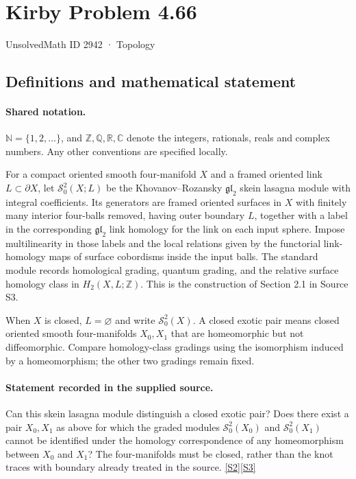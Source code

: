 \documentclass[11pt]{article}
\newcommand{\sref}[2]{\hyperlink{source:#1:#2}{[S#2]}}
\begin{document}
\setcounter{section}{2941}
\section{Kirby Problem 4.66}\label{2942}
{\small\sffamily UnsolvedMath ID 2942 · Topology}
\subsection{Definitions and mathematical statement}

\paragraph{Shared notation.}$\mathbb N=\{1,2,\ldots\}$, and $\mathbb Z,\mathbb Q,\mathbb R,\mathbb C$ denote the integers, rationals, reals and complex numbers. Any other conventions are specified locally.


For a compact oriented smooth four-manifold $X$ and a framed oriented link $L\subset\partial X$, let $\mathcal S_0^2(X;L)$ be the Khovanov--Rozansky $\mathfrak{gl}_2$ skein lasagna module with integral coefficients. Its generators are framed oriented surfaces in $X$ with finitely many interior four-balls removed, having outer boundary $L$, together with a label in the corresponding $\mathfrak{gl}_2$ link homology for the link on each input sphere. Impose multilinearity in those labels and the local relations given by the functorial link-homology maps of surface cobordisms inside the input balls. The standard module records homological grading, quantum grading, and the relative surface homology class in $H_2(X,L;\mathbb Z)$. This is the construction of Section 2.1 in Source S3.

When $X$ is closed, $L=\varnothing$ and write $\mathcal S_0^2(X)$. A closed exotic pair means closed oriented smooth four-manifolds $X_0,X_1$ that are homeomorphic but not diffeomorphic. Compare homology-class gradings using the isomorphism induced by a homeomorphism; the other two gradings remain fixed.
\paragraph{Statement recorded in the supplied source.}
Can this skein lasagna module distinguish a closed exotic pair? Does there exist a pair $X_0,X_1$ as above for which the graded modules $\mathcal S_0^2(X_0)$ and $\mathcal S_0^2(X_1)$ cannot be identified under the homology correspondence of any homeomorphism between $X_0$ and $X_1$? The four-manifolds must be closed, rather than the knot traces with boundary already treated in the source. \sref{2942}{2}\sref{2942}{3}
\end{document}
